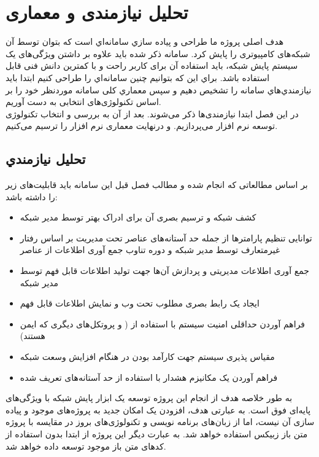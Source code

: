 \chapter{تحلیل نیازمندی و معماری}

هدف اصلی پروژه ما طراحی و پیاده سازي سامانه‌اي است که بتوان توسط آن شبکه‌های کامپیوتری را پایش کرد. سامانه ذکر شده باید علاوه بر داشتن ویژگی‌های یک سیستم پایش شبکه، باید استفاده آن برای کاربر راحت و با کمترین دانش فنی قابل استفاده باشد. براي این که بتوانیم چنین سامانه‌اي را طراحی کنیم ابتدا باید نیازمندي‌هاي سامانه را تشخیص دهیم و سپس معماري کلی سامانه موردنظر خود را بر اساس تکنولوژی‌های انتخابی به دست آوریم.
\\
در این فصل ابتدا نیازمندی‌ها ذکر می‌شوند. بعد از آن به بررسی و انتخاب تکنولوژی توسعه نرم افزار می‌پردازیم. و درنهایت معماری نرم افزار را ترسیم می‌کنیم.



\section{تحلیل نیازمندي}

 بر اساس مطالعاتی که انجام شده و مطالب فصل قبل این سامانه باید قابلیت‌های زیر را داشته باشد:

\begin{itemize}
    \item کشف شبکه و ترسیم بصری آن برای ادراک بهتر توسط مدیر شبکه
    \item توانایی تنظیم پارامترها از جمله حد آستانه‌های عناصر تحت مدیریت بر اساس رفتار غیرمتعارف توسط مدیر شبکه و دوره تناوب جمع آوری اطلاعات از عناصر
    \item جمع آوری اطلاعات مدیریتی و پردازش آن‌ها جهت تولید اطلاعات قابل فهم توسط مدیر شبکه
    \item ایجاد یک رابط بصری مطلوب تحت وب و نمایش اطلاعات قابل فهم 
    \item فراهم آوردن حداقلی امنیت سیستم با استفاده از ( و پروتکل‌های دیگری که ایمن هستند)
    \item مقیاس پذیری سیستم جهت کارآمد بودن در هنگام افزایش وسعت شبکه
    \item فراهم آوردن یک مکانیزم هشدار با استفاده از حد آستانه‌های تعریف شده
\end{itemize}

\newpage

به طور خلاصه هدف از انجام این پروژه توسعه یک ابزار پایش شبکه با ویژگی‌های پایه‌ای فوق است. به عبارتی هدف، افزودن یک امکان جدید به پروژه‌های موجود و پیاده سازی آن نیست، اما از زبان‌های برنامه نویسی و تکنولوژی‌های بروز در مقایسه با پروژه متن باز زبیکس استفاده خواهد شد. به عبارت دیگر این پروژه از ابتدا بدون استفاده از کدهای متن باز موجود توسعه داده خواهد شد.



